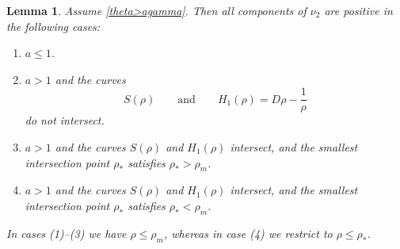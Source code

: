 \documentclass[11pt]{article}
\newtheorem{lemma}[thm]{Lemma}
\theoremstyle{definition}
\begin{document}
 \begin{lemma}\label{lem:cases} Assume \eqref{theta>agamma}. Then all components of $\nu_2$ are positive in the following cases:
\begin{enumerate}
    \item $a \le 1$.
    \item $a>1$ and the curves 
    \[
        S(\rho) \qquad \text{and} \qquad H_1(\rho) = D\rho - \frac{1}{\rho}
    \]
    do not intersect.
    \item $a>1$ and the curves $S(\rho)$ and $H_1(\rho)$ intersect, and the smallest intersection point $\rho_*$ satisfies $\rho_* > \rho_m$.
    \item $a>1$ and the curves $S(\rho)$ and $H_1(\rho)$ intersect, and the smallest intersection point $\rho_*$  satisfies $\rho_* < \rho_m$.
\end{enumerate}
In cases (1)–(3) we have $\rho \le \rho_m$, whereas in case (4) we restrict to $\rho \le \rho_*$.

\end{lemma}
\end{document}
